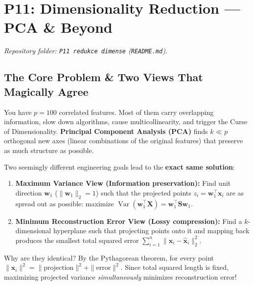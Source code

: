 \documentclass[11pt, a4paper]{article}
\begin{document}
\section{P11: Dimensionality Reduction --- PCA \& Beyond}
\emph{Repository folder: \texttt{P11 redukce dimense} (\texttt{README.md}).}

\subsection{The Core Problem \& Two Views That Magically Agree}
You have $p = 100$ correlated features. Most of them carry overlapping information, slow down algorithms, cause multicollinearity, and trigger the Curse of Dimensionality. \textbf{Principal Component Analysis (PCA)} finds $k \ll p$ orthogonal new axes (linear combinations of the original features) that preserve as much structure as possible.

Two seemingly different engineering goals lead to the \textbf{exact same solution}:
\begin{enumerate}
    \item \textbf{Maximum Variance View (Information preservation):} Find unit direction $\mathbf{w}_1$ ($\|\mathbf{w}_1\|_2 = 1$) such that the projected points $z_i = \mathbf{w}_1^\top \mathbf{x}_i$ are as spread out as possible: maximize $\operatorname{Var}(\mathbf{w}_1^\top \mathbf{X}) = \mathbf{w}_1^\top \mathbf{S} \mathbf{w}_1$.
    \item \textbf{Minimum Reconstruction Error View (Lossy compression):} Find a $k$-dimensional hyperplane such that projecting points onto it and mapping back produces the smallest total squared error $\sum_{i=1}^n \|\mathbf{x}_i - \hat{\mathbf{x}}_i\|_2^2$.
\end{enumerate}
Why are they identical? By the Pythagorean theorem, for every point $\|\mathbf{x}_i\|^2 = \|\text{projection}\|^2 + \|\text{error}\|^2$. Since total squared length is fixed, maximizing projected variance \emph{simultaneously} minimizes reconstruction error!
\end{document}
